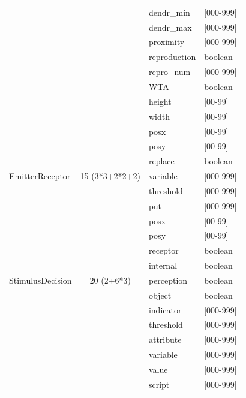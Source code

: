 \documentclass[11pt,twoside,a4paper]{article}
\begin{document}
\begin{table}[h]
\begin{center}
\begin{scriptsize}
\begin{tabular}{|p{}|c|p{}|p{}|}
	\cline{3-4} %
								&				&	dendr\_min	& [000-999] \\
	\cline{3-4} %
								&				&	dendr\_max	& [000-999] \\
	\cline{3-4} %
								&				&	proximity	& [000-999] \\
	\cline{3-4} %
								&				&	reproduction& boolean \\
	\cline{3-4} %
								&				&	repro\_num	& [000-999] \\
	\cline{3-4} %
								&				&	WTA			& boolean \\
	\cline{3-4} %
								&				&	height		& [00-99] \\
	\cline{3-4} %
								&				&	width		& [00-99] \\
	\cline{3-4} %
								&				&	posx		& [00-99] \\
	\cline{3-4} %
								&				&	posy		& [00-99] \\
	\cline{3-4} %
								&				&	replace		& boolean \\
	\hline \hline
	EmitterReceptor						& 15 (3*3+2*2+2)&	variable	& [000-999] \\
	\cline{3-4} %
								&				&	threshold	& [000-999] \\
	\cline{3-4} %
								&				&	put			& [000-999] \\
	\cline{3-4} %
								&				&	posx		& [00-99] \\
	\cline{3-4} %
								&				&	posy		& [00-99] \\
	\cline{3-4} %
								&				&	receptor	& boolean \\
	\cline{3-4} %
								&				&	internal	& boolean	\\
	\hline \hline
	StimulusDecision					&	20 (2+6*3)	&	perception	& boolean \\
	\cline{3-4} %
								&				&	object		& boolean \\
	\cline{3-4} %
								&				&	indicator	& [000-999] \\
	\cline{3-4} %
								&				&	threshold	& [000-999] \\
	\cline{3-4} %
								&				&	attribute	& [000-999] \\
	\cline{3-4} %
								&				&	variable	& [000-999] \\
	\cline{3-4} %
								&				&	value		& [000-999] \\
	\cline{3-4} %
								&				&	script		& [000-999] \\

\end{tabular}
\end{scriptsize}
\end{center}
\end{table}
\end{document}
